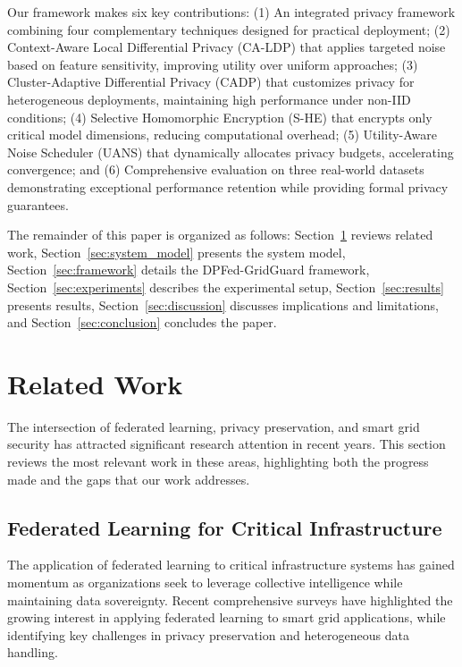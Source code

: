 \documentclass{ieeeaccess}
\theoremstyle{definition}
\begin{document}
Our framework makes six key contributions: (1) An integrated privacy framework combining four complementary techniques designed for practical deployment; (2) Context-Aware Local Differential Privacy (CA-LDP) that applies targeted noise based on feature sensitivity, improving utility over uniform approaches; (3) Cluster-Adaptive Differential Privacy (CADP) that customizes privacy for heterogeneous deployments, maintaining high performance under non-IID conditions; (4) Selective Homomorphic Encryption (S-HE) that encrypts only critical model dimensions, reducing computational overhead; (5) Utility-Aware Noise Scheduler (UANS) that dynamically allocates privacy budgets, accelerating convergence; and (6) Comprehensive evaluation on three real-world datasets demonstrating exceptional performance retention while providing formal privacy guarantees.

The remainder of this paper is organized as follows: Section~\ref{sec:related_work} reviews related work, Section~\ref{sec:system_model} presents the system model, Section~\ref{sec:framework} details the DPFed-GridGuard framework, Section~\ref{sec:experiments} describes the experimental setup, Section~\ref{sec:results} presents results, Section~\ref{sec:discussion} discusses implications and limitations, and Section~\ref{sec:conclusion} concludes the paper.

\section{Related Work}
\label{sec:related_work}

The intersection of federated learning, privacy preservation, and smart grid security has attracted significant research attention in recent years. This section reviews the most relevant work in these areas, highlighting both the progress made and the gaps that our work addresses.

\subsection{Federated Learning for Critical Infrastructure}

The application of federated learning to critical infrastructure systems has gained momentum as organizations seek to leverage collective intelligence while maintaining data sovereignty. Recent comprehensive surveys \cite{zhang2024federated, cheng2022review} have highlighted the growing interest in applying federated learning to smart grid applications, while identifying key challenges in privacy preservation and heterogeneous data handling.
\end{document}
